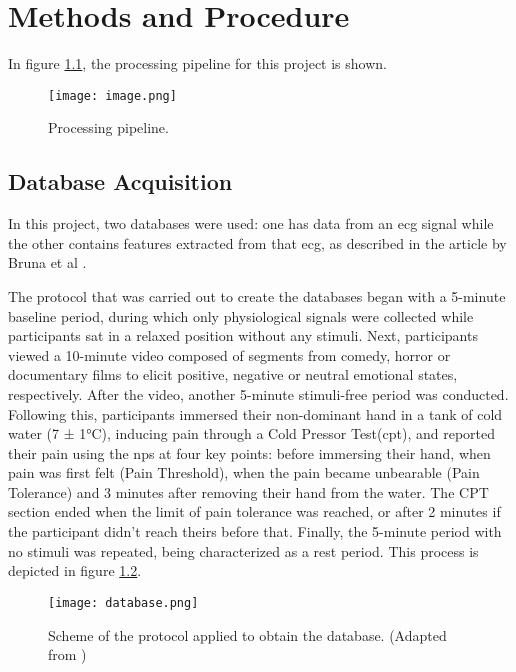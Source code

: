\chapter{Methods and Procedure}
\label{chapter:methods}

In figure \ref{fig:image}, the processing pipeline for this project is shown.

\begin{figure}[h!]
    \centering
    \texttt{[image: image.png]}
    \caption{Processing pipeline.}
    \label{fig:image}
\end{figure}

\section{Database Acquisition}
In this project, two databases were used: one has data from an \ac{ecg} signal while the other contains features extracted from that \ac{ecg}, as described in the article by Bruna et al \cite{Alves2024}.

The protocol that was carried out to create the databases began with a 5-minute baseline period, during which only physiological signals were collected while participants sat in a relaxed position without any stimuli. 
Next, participants viewed a 10-minute video composed of segments from comedy, horror or documentary films to elicit positive, negative or neutral emotional states, respectively. 
After the video, another 5-minute stimuli-free period was conducted. 
Following this, participants immersed their non-dominant hand in a tank of cold water (7 ± 1°C), inducing pain through a Cold Pressor Test(\ac{cpt}), and reported their pain using the \ac{nps} at four key points: before immersing their hand, when pain was first felt (Pain Threshold), when the pain became unbearable (Pain Tolerance) and 3 minutes after removing their hand from the water. 
The CPT section ended when the limit of pain tolerance was reached, or after 2 minutes if the participant didn’t reach theirs before that. 
Finally, the 5-minute period with no stimuli was repeated, being characterized as a rest period. 
This process is depicted in figure \ref{fig:database}. 

\begin{figure}[h!]
    \centering
    \texttt{[image: database.png]}
    \caption{Scheme of the protocol applied to obtain the database. (Adapted from \cite{Alves2024})}
    \label{fig:database}
\end{figure}

